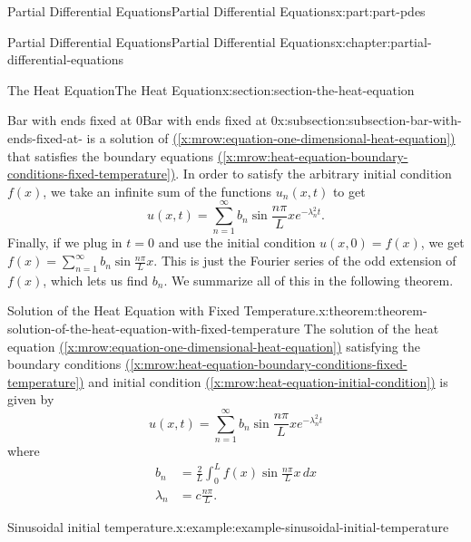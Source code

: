 \documentclass[oneside,10pt,]{book}
\newcommand{\xreffont}{\relax}
\numberwithin{equation}{part}
\newcommand{\amp}{&}
\begin{document}
\begin{partptx}{Partial Differential Equations}{}{Partial Differential Equations}{}{}{x:part:part-pdes}
\begin{chapterptx}{Partial Differential Equations}{}{Partial Differential Equations}{}{}{x:chapter:partial-differential-equations}
\begin{sectionptx}{The Heat Equation}{}{The Heat Equation}{}{}{x:section:section-the-heat-equation}
\begin{subsectionptx}{Bar with ends fixed at \(0\)}{}{Bar with ends fixed at \(0\)}{}{}{x:subsection:subsection-bar-with-ends-fixed-at-}
is a solution of \hyperref[x:mrow:equation-one-dimensional-heat-equation]{({\xreffont\ref{x:mrow:equation-one-dimensional-heat-equation}})} that satisfies the boundary equations \hyperref[x:mrow:heat-equation-boundary-conditions-fixed-temperature]{({\xreffont\ref{x:mrow:heat-equation-boundary-conditions-fixed-temperature}})}. In order to satisfy the arbitrary initial condition \(f(x)\), we take an infinite sum of the functions \(u_{n}(x,t)\) to get%
%
\begin{equation*}
u(x,t) = \sum_{n=1}^{\infty}b_{n}\sin\frac{n\pi}{L}x e^{-\lambda^{2}_{n}t}.
\end{equation*}
Finally, if we plug in \(t=0\) and use the initial condition \(u(x,0) = f(x)\), we get \(f(x) = \sum_{n=1}^{\infty}b_{n}\sin\frac{n\pi}{L}x\). This is just the Fourier series of the odd extension of \(f(x)\), which lets us find \(b_{n}\). We summarize all of this in the following theorem.%
\begin{theorem}{Solution of the Heat Equation with Fixed Temperature.}{}{x:theorem:theorem-solution-of-the-heat-equation-with-fixed-temperature}%
%
The solution of the heat equation \hyperref[x:mrow:equation-one-dimensional-heat-equation]{({\xreffont\ref{x:mrow:equation-one-dimensional-heat-equation}})} satisfying the boundary conditions \hyperref[x:mrow:heat-equation-boundary-conditions-fixed-temperature]{({\xreffont\ref{x:mrow:heat-equation-boundary-conditions-fixed-temperature}})} and initial condition \hyperref[x:mrow:heat-equation-initial-condition]{({\xreffont\ref{x:mrow:heat-equation-initial-condition}})} is given by%
\begin{equation}
u(x,t) = \sum_{n=1}^{\infty}b_{n}\sin\frac{n\pi}{L}x e^{-\lambda^{2}_{n}t}\label{x:men:heat-equation-fixed-ends-solution}
\end{equation}
where%
\begin{align}
b_{n} \amp = \frac{2}{L}\int_{0}^{L}f(x)\sin\frac{n\pi}{L}x\,dx \label{x:mrow:heat-equation-fixed-ends-solution-coeff}\\
\lambda_{n} \amp = c\frac{n\pi}{L}. \label{x:mrow:heat-equation-fixed-ends-solution-exponent}
\end{align}
%
\end{theorem}
\begin{example}{Sinusoidal initial temperature.}{x:example:example-sinusoidal-initial-temperature}%

\end{example}
\end{subsectionptx}
\end{sectionptx}
\end{chapterptx}
\end{partptx}
\end{document}
